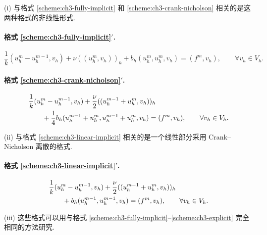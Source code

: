 \begin{Remark}[相关格式]
\label{rem:ch3-related-schemes}
(i) 与格式 \ref{scheme:ch3-fully-implicit} 和 \ref{scheme:ch3-crank-nicholson} 相关的是这两种格式的非线性形式.

\paragraph{格式 \ref{scheme:ch3-fully-implicit}$'$.}
\begin{equation}
\frac1k(u_h^m-u_h^{m-1},v_h)+\nu((u_h^m,v_h))_h
+b_h(u_h^m,u_h^m,v_h)=(f^m,v_h),
\qquad\forall v_h\in V_h.
\label{eq:ch3-scheme-51-nonlinear}
\end{equation}

\paragraph{格式 \ref{scheme:ch3-crank-nicholson}$'$.}
\begin{align}
&\frac1k(u_h^m-u_h^{m-1},v_h)
+\frac\nu2((u_h^{m-1}+u_h^m,v_h))_h \notag\\
&\qquad+\frac14b_h(u_h^{m-1}+u_h^m,u_h^{m-1}+u_h^m,v_h)
=(f^m,v_h),\qquad\forall v_h\in V_h.
\label{eq:ch3-scheme-52-nonlinear}
\end{align}

(ii) 与格式 \ref{scheme:ch3-linear-implicit} 相关的是一个线性部分采用 Crank--Nicholson 离散的格式.

\hypertarget{chapter-03-page-243}{}
\paragraph{格式 \ref{scheme:ch3-linear-implicit}$'$.}
\begin{align}
&\frac1k(u_h^m-u_h^{m-1},v_h)
+\frac\nu2((u_h^{m-1}+u_h^m,v_h))_h \notag\\
&\qquad+b_h(u_h^{m-1},u_h^{m-1},v_h)
=(f^m,v_h),\qquad\forall v_h\in V_h.
\label{eq:ch3-scheme-53-crank-nicholson}
\end{align}

(iii) 这些格式可以用与格式 \ref{scheme:ch3-fully-implicit}--\ref{scheme:ch3-explicit} 完全相同的方法研究.
\end{Remark}

